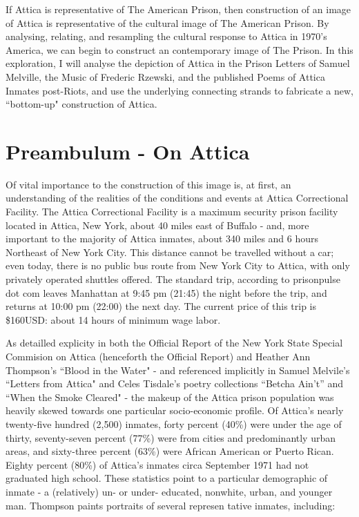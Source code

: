 \documentclass[14pt, letterpaper]{report}
\begin{document}
	If Attica is representative of The American Prison, then construction 
	of an image of Attica is representative of the cultural image of 
	The American Prison. By analysing, relating, and resampling the 
	cultural response to Attica in 1970's America, we can begin to 
	construct an contemporary image of The Prison. In this exploration, 
	I will analyse the depiction of Attica in the Prison Letters of 
	Samuel Melville, the Music of Frederic Rzewski, and the published 
	Poems of Attica Inmates post-Riots, and use the underlying connecting 
	strands to fabricate a new, ``bottom-up" construction of Attica. 
	
	\section*{Preambulum - On Attica}
	
	Of vital importance to the construction of this image is, at first, 
	an understanding of the realities of the conditions and events at 
	Attica Correctional Facility. The Attica Correctional Facility is a 
	maximum security prison facility located in Attica, New York, about 
	40 miles east of Buffalo - and, more important to the majority of 
	Attica inmates, about 340 miles and 6 hours Northeast of New York 
	City. This distance cannot be travelled without a car; even today, 
	there is no public bus route from New York City to Attica, with only 
    privately operated shuttles offered. The standard trip, according to 
    prisonpulse dot com leaves Manhattan at 9:45 pm (21:45) the night before the 
    trip, and returns at 10:00 pm (22:00) the next day. The current price of 
    this trip is \$160USD: about 14 hours of minimum wage labor. 
    
    As detailled explicity in both the Official Report of the New York State Special Commision on 
    Attica (henceforth the Official Report) and Heather Ann Thompson's ``Blood in the 
    Water" - and referenced implicitly in Samuel Melvile's ``Letters from Attica" and 
    Celes Tisdale's poetry collections ``Betcha Ain't'' and ``When the Smoke Cleared" - 
    the makeup of the Attica prison population was heavily skewed towards one particular 
    socio-economic profile. Of Attica's nearly twenty-five hundred (2,500) inmates, forty 
    percent (40\%) were under the age of thirty, seventy-seven percent (77\%) were from 
    cities and predominantly urban areas, and sixty-three percent (63\%) were African 
    American or Puerto Rican. Eighty percent (80\%) of Attica's inmates circa September 1971 
    had not graduated high school. \autocite[580]{blood-in-water}
    These statistics point to a particular demographic of 
    inmate - a (relatively) un- or under- educated, nonwhite, urban, and younger man. 
    Thompson paints portraits of several represen	tative inmates, including: 
    
\end{document}
